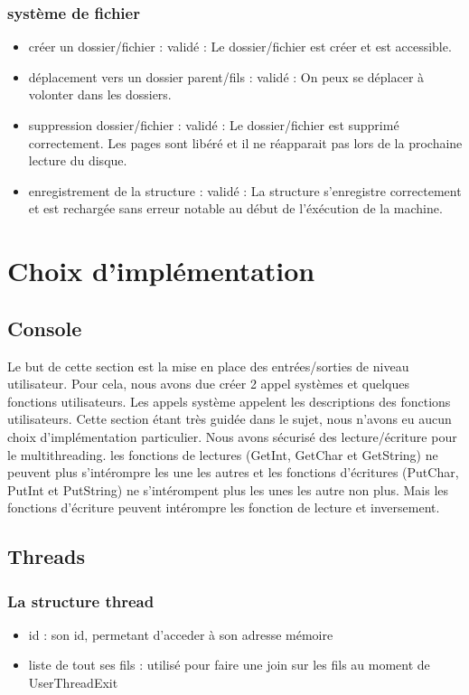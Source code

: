 \documentclass{article}
\begin{document}
		\subsubsection{système de fichier}
			\begin{itemize}
				\item créer un dossier/fichier :				validé : Le dossier/fichier est créer et est accessible.
				\item déplacement vers un dossier parent/fils :	validé : On peux se déplacer à volonter dans les dossiers.
				\item suppression dossier/fichier :				validé : Le dossier/fichier est supprimé correctement. Les pages sont libéré et il ne réapparait pas lors de la prochaine lecture du disque.
				\item enregistrement de la structure :			validé : La structure s'enregistre correctement et est rechargée sans erreur notable au début de l'éxécution de la machine.
			\end{itemize}

\section{Choix d'implémentation}
	\subsection{Console}
	    {Le but de cette section est la mise en place des entrées/sorties de niveau utilisateur. Pour cela, nous avons due créer 2 appel systèmes et quelques fonctions utilisateurs. Les appels système appelent les descriptions des fonctions utilisateurs. Cette section étant très guidée dans le sujet, nous n'avons eu aucun choix d'implémentation particulier.
	    Nous avons sécurisé des lecture/écriture pour le multithreading. les fonctions de lectures (GetInt, GetChar et GetString) ne peuvent plus s'intérompre les une les autres et les fonctions d'écritures (PutChar, PutInt et PutString) ne s'intérompent plus les unes les autre non plus. Mais les fonctions d'écriture peuvent intérompre les fonction de lecture et inversement.}

	\subsection{Threads}
		\subsubsection{La structure thread}
			\begin{itemize}
				\item id : son id, permetant d'acceder à son adresse mémoire
				\item liste de tout ses fils : utilisé pour faire une join sur les fils au moment de UserThreadExit
			\end{itemize}
\end{document}
